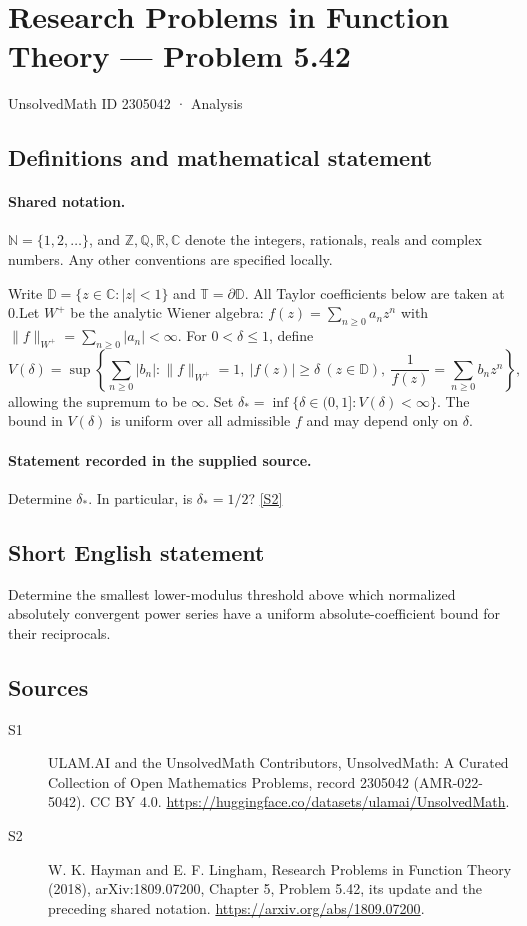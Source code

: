 \documentclass[11pt]{article}
\newcommand{\sref}[2]{\hyperlink{source:#1:#2}{[S#2]}}
\begin{document}
\setcounter{section}{2305041}
\section{Research Problems in Function Theory — Problem 5.42}\label{2305042}
{\small\sffamily UnsolvedMath ID 2305042 · Analysis}
\subsection{Definitions and mathematical statement}

\paragraph{Shared notation.}$\mathbb N=\{1,2,\ldots\}$, and $\mathbb Z,\mathbb Q,\mathbb R,\mathbb C$ denote the integers, rationals, reals and complex numbers. Any other conventions are specified locally.


Write $\mathbb D=\{z\in\mathbb C:|z|<1\}$ and $\mathbb T=\partial\mathbb D$. All Taylor coefficients below are taken at $0$.Let $W^+$ be the analytic Wiener algebra: $f(z)=\sum_{n\ge0}a_nz^n$ with $\|f\|_{W^+}=\sum_{n\ge0}|a_n|<\infty$. For $0<\delta\le1$, define
\[V(\delta)=\sup\left\{\sum_{n\ge0}|b_n|:\|f\|_{W^+}=1,\ |f(z)|\ge\delta\ (z\in\mathbb D),\ \frac1{f(z)}=\sum_{n\ge0}b_nz^n\right\},
\]
allowing the supremum to be $\infty$. Set $\delta_* =\inf\{\delta\in(0,1]:V(\delta)<\infty\}$. The bound in $V(\delta)$ is uniform over all admissible $f$ and may depend only on $\delta$.
\paragraph{Statement recorded in the supplied source.}
Determine $\delta_*$. In particular, is $\delta_*=1/2$? \sref{2305042}{2}
\subsection{Short English statement}
Determine the smallest lower-modulus threshold above which normalized absolutely convergent power series have a uniform absolute-coefficient bound for their reciprocals.
\subsection{Sources}
\begin{description}
\item[\hypertarget{source:2305042:1}{S1}] ULAM.AI and the UnsolvedMath Contributors, UnsolvedMath: A Curated Collection of Open Mathematics Problems, record 2305042 (AMR-022-5042). CC BY 4.0. \url{https://huggingface.co/datasets/ulamai/UnsolvedMath}.
\item[\hypertarget{source:2305042:2}{S2}] W. K. Hayman and E. F. Lingham, Research Problems in Function Theory (2018), arXiv:1809.07200, Chapter 5, Problem 5.42, its update and the preceding shared notation. \url{https://arxiv.org/abs/1809.07200}.
\end{description}
\label{end:2305042}
\end{document}

